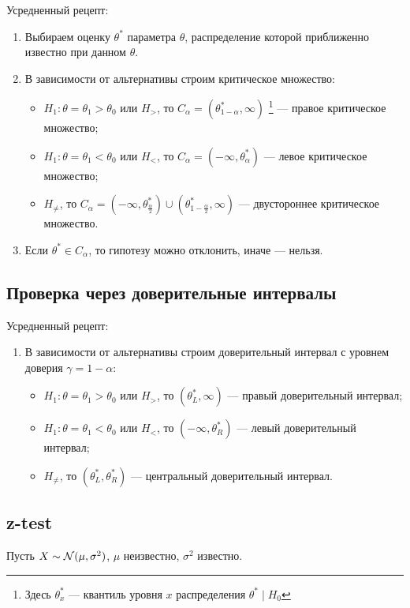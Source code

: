 \documentclass[11pt]{book}
\begin{document}
Усредненный рецепт:
\begin{enumerate}
	\item Выбираем оценку $\theta^*$ параметра $\theta$, распределение которой приближенно известно при данном $\theta$.
	\item В зависимости от альтернативы строим критическое множество:
		\begin{itemize}
			\item $H_1\colon \theta = \theta_1 > \theta_0$ или $H_{>}$, то $C_{\alpha} = (\theta^*_{1-\alpha}, \infty)$ \footnote{Здесь $\theta^*_{x}$ --- квантиль уровня $x$ распределения $\theta^* \mid H_0$} --- правое критическое множество;
			\item $H_1\colon \theta = \theta_1 < \theta_0$ или $H_{<}$, то $C_{\alpha} = (-\infty, \theta^*_{\alpha})$ --- левое критическое множество;
			\item $H_{\neq}$, то $C_{\alpha} = (-\infty, \theta^*_{\frac{\alpha}{2}}) \cup (\theta^*_{1 - \frac{\alpha}{2}}, \infty)$ --- двустороннее критическое множество.
		\end{itemize}
	\item Если $\theta^* \in  C_{\alpha}$, то гипотезу можно отклонить, иначе --- нельзя.
\end{enumerate}

\subsection{Проверка через доверительные интервалы}
Усредненный рецепт:
\begin{enumerate}
	\item В зависимости от альтернативы строим доверительный интервал с уровнем доверия $\gamma = 1 - \alpha$:
		\begin{itemize}
			\item $H_1\colon \theta = \theta_1 > \theta_0$ или $H_{>}$, то $(\theta^*_{L}, \infty)$ --- правый доверительный интервал;
			\item $H_1\colon \theta = \theta_1 < \theta_0$ или $H_{<}$, то $(-\infty, \theta^*_{R})$ --- левый доверительный интервал;
			\item $H_{\neq}$, то $(\theta^*_{L} , \theta^*_{R})$ --- центральный доверительный интервал.
		\end{itemize}
\end{enumerate}

\subsection{z-test}
Пусть $X \sim \mathcal{N}(\mu, \sigma^2)$, $\mu$ неизвестно, $\sigma^2$ известно.
\end{document}
